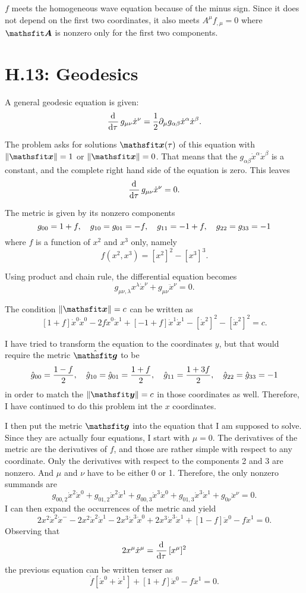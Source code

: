 $f$ meets the homogeneous wave equation because of the minus sign. Since it
does not depend on the first two coordinates, it also meets $A^\mu f_{,\mu} =
0$ where $\tens A$ is nonzero only for the first two components.

\section*{H.13: Geodesics}

A general geodesic equation is given:
\[
    \dod{}\tau g_{\mu\nu} \dot x^\nu = \frac12 \partial_\mu g_{\alpha\beta}
    \dot x^\alpha \dot x^\beta.
\]

The problem asks for solutions $\tens x(\tau)$ of this equation with $\| \tens
x \| = 1$ or $\| \tens x \| = 0$. That means that the $g_{\alpha\beta} \dot
x^\alpha \dot x^\beta$ is a constant, and the complete right hand side of the
equation is zero. This leaves
\[
    \dod{}\tau g_{\mu\nu} \dot x^\nu = 0.
\]

The metric is given by its nonzero components
\[
    g_{00} = 1 + f
    ,\quad
    g_{10} = g_{01} = -f
    ,\quad
    g_{11} = -1 + f
    ,\quad
    g_{22} = g_{33} = -1
\]
where $f$ is a function of $x^2$ and $x^3$ only, namely
\[
    f(x^2, x^3) = [x^2]^2 - [x^3]^3.
\]

Using product and chain rule, the differential equation becomes
\[
    g_{\mu\nu,\lambda} x^\lambda \dot x^\nu + g_{\mu\nu} \ddot x^\nu = 0.
\]

The condition $\| \tens x \| = c$ can be written as
\[
    [1+f] \dot x^0 \dot x^0 - 2f \dot x^0 \dot x^1 + [-1+f] \dot x^1 \dot x^1 -
    [\dot x^2]^2 - [\dot x^2]^2 = c.
\]

I have tried to transform the equation to the coordinates $y$, but that would
require the metric $\hat{\tens g}$ to be
\[
    \hat g_{00} = \frac{1-f}2
    ,\quad
    \hat g_{10} = \hat g_{01} = \frac{1+f}2
    ,\quad
    \hat g_{11} = \frac{1+3f}2
    ,\quad
    \hat g_{22} = \hat g_{33} = -1
\]
in order to match the $\| \tens y \| = c$ in those coordinates as well.
Therefore, I have continued to do this problem int the $x$ coordinates.

I then put the metric $\tens g$ into the equation that I am supposed to solve.
Since they are actually four equations, I start with $\mu = 0$. The derivatives
of the metric are the derivatives of $f$, and those are rather simple with
respect to any coordinate. Only the derivatives with respect to the components
2 and 3 are nonzero. And $\mu$ and $\nu$ have to be either 0 or 1. Therefore,
the only nonzero summands are
\[
    g_{00,2} \dot x^2 \dot x^0 + g_{01,2} \dot x^2 \dot x^1 + g_{00,3} \dot x^3
    \dot x^0 + g_{01,3} \dot x^3 \dot x^1 + g_{0\nu} \ddot x^\nu = 0.
\]
I can then expand the occurrences of the metric and yield
\[
    2 x^2 \dot x^2 \dot x^- - 2 x^2 \dot x^2 \dot x^1 - 2 x^3 \dot x^3 \dot x^0
    + 2 x^3 \dot x^3 \dot x^1 + [1-f] \ddot x^0 - f \ddot x^1 = 0.
\]
Observing that
\[
    2 x^\mu \dot x^\mu = \dod{}\tau [x^\mu]^2
\]
the previous equation can be written terser as
\[
    \dot f [\dot x^0 + \dot x^1] + [1+f] \ddot x^0 - f \ddot x^1 = 0.
\]

